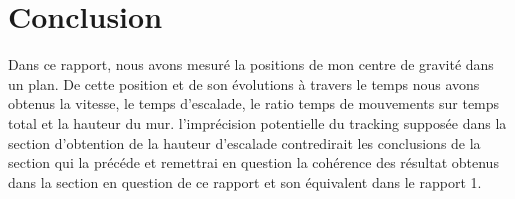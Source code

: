 \documentclass[11pt]{article}
\begin{document}
\section{Conclusion}
\label{sec:org9c90621}

Dans ce rapport, nous avons mesuré la positions de mon centre de gravité dans un plan. De cette position et de son évolutions à travers le temps nous
avons obtenus la vitesse, le temps d'escalade, le ratio temps de mouvements sur temps total et la hauteur du mur. l'imprécision potentielle du tracking
supposée dans la section d'obtention de la hauteur d'escalade contredirait les conclusions de la section qui la précéde et remettrai en question la
cohérence des résultat obtenus dans la section en question de ce rapport et son équivalent dans le rapport 1.
\end{document}
